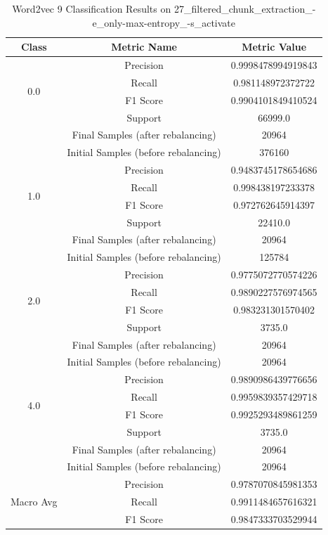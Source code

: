 \begin{longtable}{|c|c|c|}
\caption{Word2vec 9 Classification Results on 27\_filtered\_chunk\_extraction\_-e\_only-max-entropy\_-s\_activate} \label{tab:27_filtered_chunk_extraction_-e_only-max-entropy_-s_activate_word2vec_9_classifiers_results} \\
\hline
Class & Metric Name & Metric Value \\
\hline
\multirow{4}{*}{0.0} & Precision & 0.9998478994919843 \\
 & Recall & 0.981148972372722 \\
 & F1 Score & 0.9904101849410524 \\
 & Support & 66999.0 \\
 & Final Samples (after rebalancing) & 20964 \\
 & Initial Samples (before rebalancing) & 376160 \\
\hline
\multirow{4}{*}{1.0} & Precision & 0.9483745178654686 \\
 & Recall & 0.998438197233378 \\
 & F1 Score & 0.972762645914397 \\
 & Support & 22410.0 \\
 & Final Samples (after rebalancing) & 20964 \\
 & Initial Samples (before rebalancing) & 125784 \\
\hline
\multirow{4}{*}{2.0} & Precision & 0.9775072770574226 \\
 & Recall & 0.9890227576974565 \\
 & F1 Score & 0.983231301570402 \\
 & Support & 3735.0 \\
 & Final Samples (after rebalancing) & 20964 \\
 & Initial Samples (before rebalancing) & 20964 \\
\hline
\multirow{4}{*}{4.0} & Precision & 0.9890986439776656 \\
 & Recall & 0.9959839357429718 \\
 & F1 Score & 0.9925293489861259 \\
 & Support & 3735.0 \\
 & Final Samples (after rebalancing) & 20964 \\
 & Initial Samples (before rebalancing) & 20964 \\
\hline
\multirow{4}{*}{Macro Avg} & Precision & 0.9787070845981353 \\
 & Recall & 0.9911484657616321 \\
 & F1 Score & 0.9847333703529944 \\

\end{longtable}

